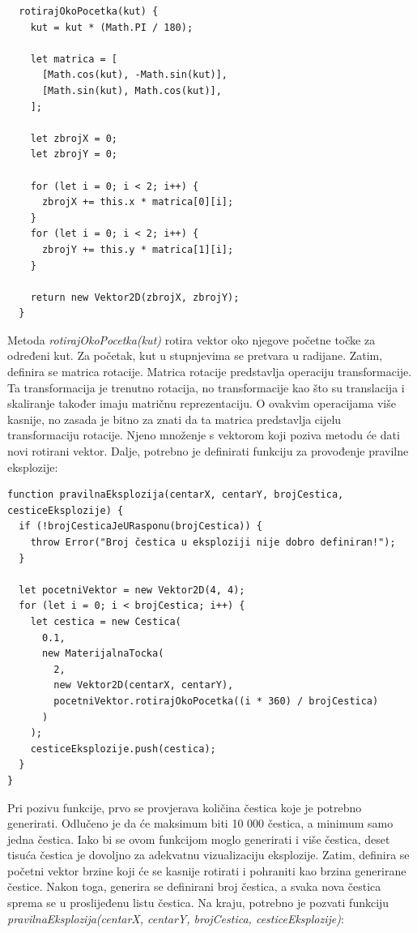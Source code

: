 \documentclass{foi}
\begin{document}
\begin{verbatim}
  rotirajOkoPocetka(kut) {
    kut = kut * (Math.PI / 180);

    let matrica = [
      [Math.cos(kut), -Math.sin(kut)],
      [Math.sin(kut), Math.cos(kut)],
    ];

    let zbrojX = 0;
    let zbrojY = 0;

    for (let i = 0; i < 2; i++) {
      zbrojX += this.x * matrica[0][i];
    }
    for (let i = 0; i < 2; i++) {
      zbrojY += this.y * matrica[1][i];
    }

    return new Vektor2D(zbrojX, zbrojY);
  }
\end{verbatim}

Metoda \textit{rotirajOkoPocetka(kut)} rotira vektor oko njegove početne točke za određeni kut. Za početak, kut u stupnjevima se pretvara u radijane. Zatim, definira se matrica rotacije. Matrica rotacije predstavlja operaciju transformacije. Ta transformacija je trenutno rotacija, no transformacije kao što su translacija i skaliranje također imaju matričnu reprezentaciju. O ovakvim operacijama više kasnije, no zasada je bitno za znati da ta matrica predstavlja cijelu transformaciju rotacije. Njeno množenje s vektorom koji poziva metodu će dati novi rotirani vektor. Dalje, potrebno je definirati funkciju za provođenje pravilne eksplozije:

\begin{verbatim}
function pravilnaEksplozija(centarX, centarY, brojCestica, cesticeEksplozije) {
  if (!brojCesticaJeURasponu(brojCestica)) {
    throw Error("Broj čestica u eksploziji nije dobro definiran!");
  }

  let pocetniVektor = new Vektor2D(4, 4);
  for (let i = 0; i < brojCestica; i++) {
    let cestica = new Cestica(
      0.1,
      new MaterijalnaTocka(
        2,
        new Vektor2D(centarX, centarY),
        pocetniVektor.rotirajOkoPocetka((i * 360) / brojCestica)
      )
    );
    cesticeEksplozije.push(cestica);
  }
}

\end{verbatim}

Pri pozivu funkcije, prvo se provjerava količina čestica koje je potrebno generirati. Odlučeno je da će maksimum biti 10 000 čestica, a minimum samo jedna čestica. Iako bi se ovom funkcijom moglo generirati i više čestica, deset tisuća čestica je dovoljno za adekvatnu vizualizaciju eksplozije. Zatim, definira se početni vektor brzine koji će se kasnije rotirati i pohraniti kao brzina generirane čestice. Nakon toga, generira se definirani broj čestica, a svaka nova čestica sprema se u proslijeđenu listu čestica. Na kraju, potrebno je pozvati funkciju \textit{pravilnaEksplozija(centarX, centarY, brojCestica, cesticeEksplozije)}:
\end{document}
